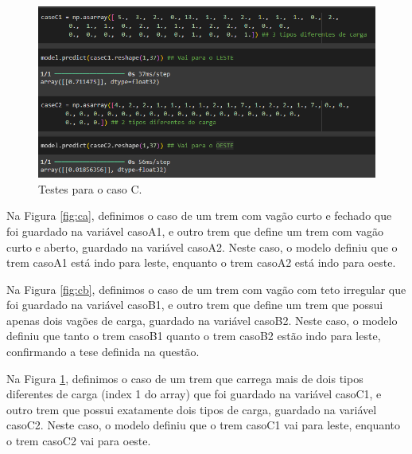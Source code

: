 \documentclass[12pt]{article}
\begin{document}
\begin{figure}[h]
    \centering
    \includegraphics[width=0.8\linewidth]{3CC.png}
    \caption{Testes para o caso C.}
    \label{fig:cc}
\end{figure}

Na Figura \ref{fig:ca}, definimos o caso de um trem com vagão curto e fechado que foi guardado na variável casoA1, e outro trem que define um trem com vagão curto e aberto, guardado na variável casoA2. Neste caso, o modelo definiu que o trem casoA1 está indo para leste, enquanto o trem casoA2 está indo para oeste. 

Na Figura \ref{fig:cb}, definimos o caso de um trem com vagão com teto irregular que foi guardado na variável casoB1, e outro trem que define um trem que possui apenas dois vagões de carga, guardado na variável casoB2. Neste caso, o modelo definiu que tanto o trem casoB1 quanto o trem casoB2 estão indo para leste, confirmando a tese definida na questão.

Na Figura \ref{fig:cc}, definimos o caso de um trem que carrega mais de dois tipos diferentes de carga (index 1 do array) que foi guardado na variável casoC1, e outro trem que possui exatamente dois tipos de carga, guardado na variável casoC2. Neste caso, o modelo definiu que o trem casoC1 vai para leste, enquanto o trem casoC2 vai para oeste.



\end{document}

